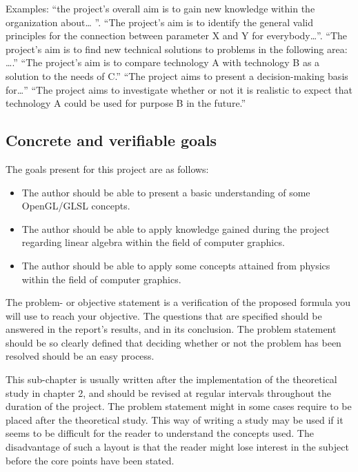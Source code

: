 Examples: “the project's overall aim is to gain new knowledge within the organization about… ”. “The project's aim is to identify the general valid principles for the connection between parameter X and Y for everybody…”. “The project's aim is to find new technical solutions to problems in the following area: ….” “The project's aim is to compare technology A with technology B as a solution to the needs of C.” “The project aims to present a decision-making basis for…” “The project aims to investigate whether or not it is realistic to expect that technology A could be used for purpose B in the future.”
\fi

\subsection{Concrete and verifiable goals}

The goals present for this project are as follows:

\begin{itemize}
	\item The author should be able to present a basic understanding of some OpenGL/GLSL concepts.
	\item The author should be able to apply knowledge gained during the project regarding linear algebra within the field of computer graphics.
	\item The author should be able to apply some concepts attained from physics within the field of computer graphics. 
\end{itemize}

\iffalse
\label{ch:intro:verifiable-goals}
The problem- or objective statement is a verification of the proposed formula you will use to reach your objective. The questions that are specified should be answered in the report's results, and in its conclusion. The problem statement should be so clearly defined that deciding whether or not the problem has been resolved should be an easy process.

This sub-chapter is usually written after the implementation of the theoretical study in chapter 2, and should be revised at regular intervals throughout the duration of the project. The problem statement might in some cases require to be placed after the theoretical study. This way  of  writing a study may be used if it seems to be difficult for the reader to understand the concepts used. The disadvantage of such a layout is that the reader might lose interest in the subject before the core points have been stated.


